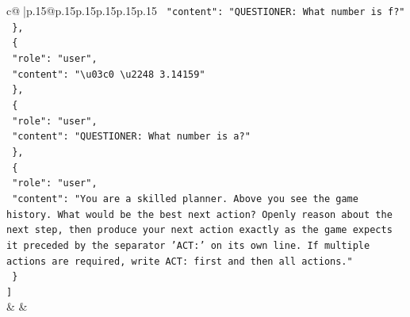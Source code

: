 \documentclass{article}
\begin{document}
{\begin{supertabular}{c@{$\;$}|p{.15\linewidth}@{}p{.15\linewidth}p{.15\linewidth}p{.15\linewidth}p{.15\linewidth}p{.15\linewidth}}
{{{\texttt{    "content": "QUESTIONER: What number is f?"} \\
\texttt{  \},} \\
\texttt{  \{} \\
\texttt{    "role": "user",} \\
\texttt{    "content": "\textbackslash{}u03c0 \textbackslash{}u2248 3.14159"} \\
\texttt{  \},} \\
\texttt{  \{} \\
\texttt{    "role": "user",} \\
\texttt{    "content": "QUESTIONER: What number is a?"} \\
\texttt{  \},} \\
\texttt{  \{} \\
\texttt{    "role": "user",} \\
\texttt{    "content": "You are a skilled planner. Above you see the game history. What would be the best next action? Openly reason about the next step, then produce your next action exactly as the game expects it preceded by the separator 'ACT:' on its own line. If multiple actions are required, write ACT: first and then all actions."} \\
\texttt{  \}} \\
\texttt{{]}} \\
            }
        }
    }
    & & \\ \\


\end{supertabular}}
\end{document}
